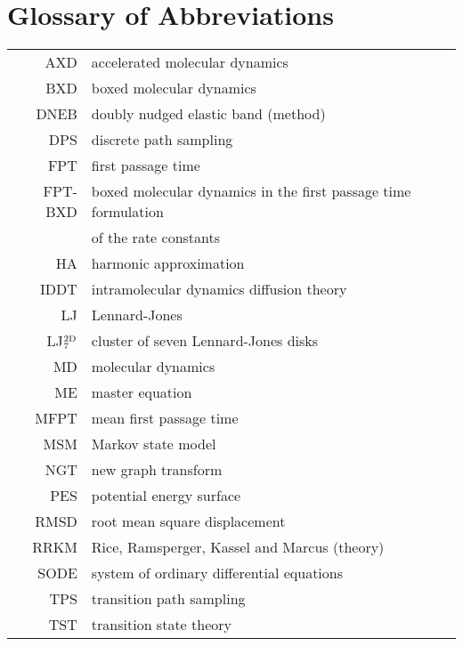 \chapter*{Glossary of Abbreviations}

\begin{longtable}{r >{\rule{0pt}{3ex}}l<{\rule[-1.5ex]{0pt}{0pt}}}
AXD & accelerated molecular dynamics \\
BXD & boxed molecular dynamics \\
DNEB & doubly nudged elastic band (method) \\
DPS & discrete path sampling \\
FPT & first passage time \\
FPT-BXD & boxed molecular dynamics in the first passage time formulation \\
&  of the rate constants\\
HA & harmonic approximation \\
IDDT & intramolecular dynamics diffusion theory \\
LJ & Lennard-Jones \\
LJ$_7^{\rm 2D}$ & cluster of seven Lennard-Jones disks \\
MD & molecular dynamics \\
ME & master equation \\
MFPT & mean first passage time \\
MSM & Markov state model \\
NGT & new graph transform \\
PES & potential energy surface \\
RMSD & root mean square displacement \\
RRKM & Rice, Ramsperger, Kassel and Marcus (theory) \\
SODE & system of ordinary differential equations \\
TPS & transition path sampling \\
TST & transition state theory \\
\end{longtable}


